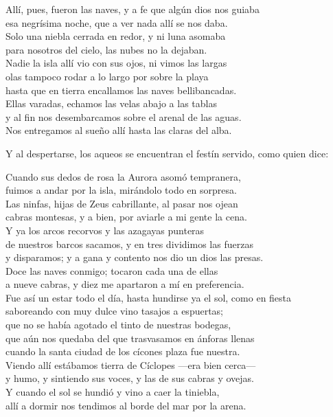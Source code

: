 \begin{versocita}
Allí, pues, fueron las naves, y a fe que algún dios nos guiaba\\
esa negrísima noche, que a ver nada allí se nos daba.\\
Solo una niebla cerrada en redor, y ni luna asomaba\\
para nosotros del cielo, las nubes no la dejaban.\\
Nadie la isla allí vio con sus ojos, ni vimos las largas\\
olas tampoco rodar a lo largo por sobre la playa\\
hasta que en tierra encallamos las naves bellibancadas.\\
Ellas varadas, echamos las velas abajo a las tablas\\
y al fin nos desembarcamos sobre el arenal de las aguas.\\
Nos entregamos al sueño allí hasta las claras del alba.
\end{versocita}

Y al despertarse, los aqueos se encuentran el festín servido, como quien dice:

\begin{versocita}
Cuando sus dedos de rosa la Aurora asomó tempranera,\\
fuimos a andar por la isla, mirándolo todo en sorpresa.\\
Las ninfas, hijas de Zeus cabrillante, al pasar nos ojean\\
cabras montesas, y a bien, por aviarle a mi gente la cena.\\
Y ya los arcos recorvos y las azagayas punteras\\
de nuestros barcos sacamos, y en tres dividimos las fuerzas\\
y disparamos; y a gana y contento nos dio un dios las presas.\\
\stanzabreak
Doce las naves conmigo; tocaron cada una de ellas\\
a nueve cabras, y diez me apartaron a mí en preferencia.\\
Fue así un estar todo el día, hasta hundirse ya el sol, como en fiesta\\
saboreando con muy dulce vino tasajos a espuertas;\\
que no se había agotado el tinto de nuestras bodegas,\\
que aún nos quedaba del que trasvasamos en ánforas llenas\\
cuando la santa ciudad de los cícones plaza fue nuestra.\\
Viendo allí estábamos tierra de Cíclopes ---era bien cerca---\\
y humo, y sintiendo sus voces, y las de sus cabras y ovejas.\\
Y cuando el sol se hundió y vino a caer la tiniebla,\\
allí a dormir nos tendimos al borde del mar por la arena.
\end{versocita}

